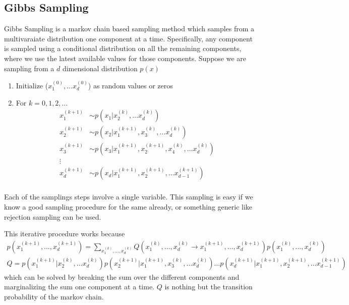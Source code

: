 \documentclass[../../statistical_learning_notes.tex]{subfiles}
\begin{document}
\subsection{Gibbs Sampling}
Gibbs Sampling is a markov chain based sampling method which samples from a multivaraiate distribution one component at a time. Specifically, any component is sampled using a conditional distribution on all the remaining components, where we use the latest available values for those components. Suppose we are sampling from a $d$ dimensional distribution $p(x)$
\begin{enumerate}
    \item Initialize ($x_{1}^{(0)},\ldots x_{d}^{(0)}$) as random values or zeros
    \item For $k = 0,1,2,\ldots$
    \begin{align*}
        x_{1}^{(k+1)} &\sim p(x_{1}|x_{2}^{(k)},\ldots x_{d}^{(k)})\\
        x_{2}^{(k+1)} &\sim p(x_{2}|x_{1}^{(k+1)},x_{3}^{(k)},\ldots x_{d}^{(k)})\\
        x_{3}^{(k+1)} &\sim p(x_{3}|x_{1}^{(k+1)},x_{2}^{(k+1)},x_{4}^{(k)},\ldots x_{d}^{(k)})\\
        \vdots\\
        x_{d}^{(k+1)} &\sim p(x_{d}|x_{1}^{(k+1)},x_{2}^{(k+1)},\ldots x_{d-1}^{(k+1)})\\
    \end{align*}
\end{enumerate}

Each of the samplings steps involve a single variable. This sampling is easy if we know a good sampling procedure for the same already, or something generic like rejection sampling can be used.\newline

This iterative procedure works because
\begin{gather*}
    p(x_{1}^{(k+1)},\ldots,x_{d}^{(k+1)}) = \sum_{x_{1}^{(k)},\ldots,x_{d}^{(k)}} Q(x_{1}^{(k)},\ldots,x_{d}^{(k)} \rightarrow x_{1}^{(k+1)},\ldots,x_{d}^{(k+1)}) p(x_{1}^{(k)},\ldots,x_{d}^{(k)})\\
    Q = p(x_{1}^{(k+1)}|x_{2}^{(k)},\ldots x_{d}^{(k)})p(x_{2}^{(k+1)}|x_{1}^{(k+1)},x_{3}^{(k)},\ldots x_{d}^{(k)}) \ldots p(x_{d}^{(k+1)}|x_{1}^{(k+1)},x_{2}^{(k+1)},\ldots x_{d-1}^{(k+1)})
\end{gather*}
which can be solved by breaking the sum over the different components and marginalizing the sum one component at a time. $Q$ is nothing but the transition probability of the markov chain.\newline
\end{document}
